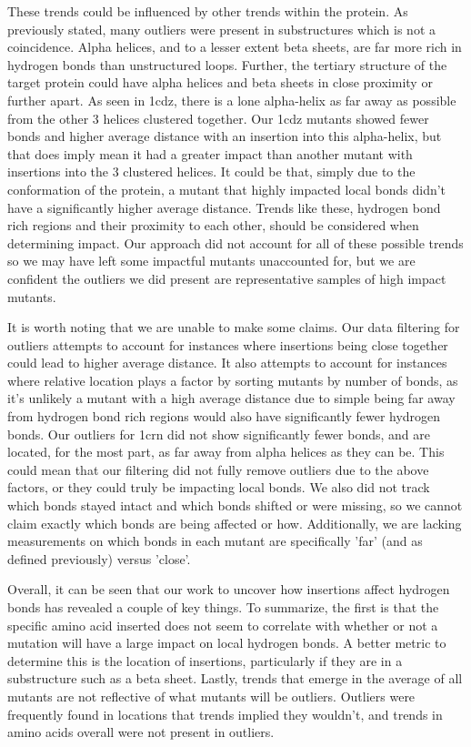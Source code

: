 \documentclass[sigconf, screen, authorversion, authoraddress=false, oneside]{acmart}
\begin{document}
These trends could be influenced by other trends within the protein. As previously stated, many outliers were present in substructures which is not a coincidence. Alpha helices, and to a lesser extent beta sheets, are far more rich in hydrogen bonds than unstructured loops. Further, the tertiary structure of the target protein could have alpha helices and beta sheets in close proximity or further apart. As seen in 1cdz, there is a lone alpha-helix as far away as possible from the other 3 helices clustered together. Our 1cdz mutants showed fewer bonds and higher average distance with an insertion into this alpha-helix, but that does imply mean it had a greater impact than another mutant with insertions into the 3 clustered helices. It could be that, simply due to the conformation of the protein, a mutant that highly impacted local bonds didn't have a significantly higher average distance. Trends like these, hydrogen bond rich regions and their proximity to each other, should be considered when determining impact. Our approach did not account for all of these possible trends so we may have left some impactful mutants unaccounted for, but we are confident the outliers we did present are representative samples of high impact mutants.

It is worth noting that we are unable to make some claims. Our data filtering for outliers attempts to account for instances where insertions being close together could lead to higher average distance. It also attempts to account for instances where relative location plays a factor by sorting mutants by number of bonds, as it's unlikely a mutant with a high average distance due to simple being far away from hydrogen bond rich regions would also have significantly fewer hydrogen bonds. Our outliers for 1crn did not show significantly fewer bonds, and are located, for the most part, as far away from alpha helices as they can be. This could mean that our filtering did not fully remove outliers due to the above factors, or they could truly be impacting local bonds. We also did not track which bonds stayed intact and which bonds shifted or were missing, so we cannot claim exactly which bonds are being affected or how. Additionally, we are lacking measurements on which bonds in each mutant are specifically 'far' (and as defined previously) versus 'close'.

Overall, it can be seen that our work to uncover how insertions affect hydrogen bonds has revealed a couple of key things. To summarize, the first is that the specific amino acid inserted does not seem to correlate with whether or not a mutation will have a large impact on local hydrogen bonds. A better metric to determine this is the location of insertions, particularly if they are in a substructure such as a beta sheet. Lastly, trends that emerge in the average of all mutants are not reflective of what mutants will be outliers. Outliers were frequently found in locations that trends implied they wouldn't, and trends in amino acids overall were not present in outliers.
\end{document}
